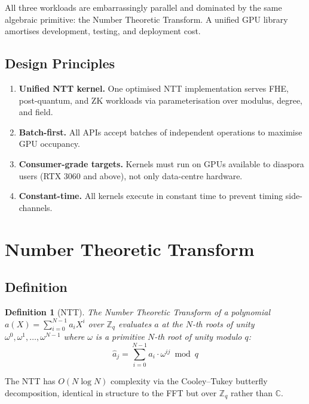 \documentclass[11pt,a4paper]{article}
\newtheorem{definition}{Definition}[section]
\begin{document}
All three workloads are embarrassingly parallel and dominated by the
same algebraic primitive: the Number Theoretic Transform.  A unified
GPU library amortises development, testing, and deployment cost.

\subsection{Design Principles}

\begin{enumerate}
    \item \textbf{Unified NTT kernel.}  One optimised NTT implementation
    serves FHE, post-quantum, and ZK workloads via parameterisation over
    modulus, degree, and field.
    \item \textbf{Batch-first.}  All APIs accept batches of independent
    operations to maximise GPU occupancy.
    \item \textbf{Consumer-grade targets.}  Kernels must run on GPUs
    available to diaspora users (RTX 3060 and above), not only
    data-centre hardware.
    \item \textbf{Constant-time.}  All kernels execute in constant time
    to prevent timing side-channels.
\end{enumerate}

\section{Number Theoretic Transform}
\label{sec:ntt}

\subsection{Definition}

\begin{definition}[NTT]
    The Number Theoretic Transform of a polynomial
    $a(X) = \sum_{i=0}^{N-1} a_i X^i$ over $\mathbb{Z}_q$ evaluates
    $a$ at the $N$-th roots of unity $\omega^0, \omega^1, \ldots,
    \omega^{N-1}$ where $\omega$ is a primitive $N$-th root of unity
    modulo $q$:
    \[
        \hat{a}_j = \sum_{i=0}^{N-1} a_i \cdot \omega^{ij} \bmod q
    \]
\end{definition}

The NTT has $O(N \log N)$ complexity via the Cooley--Tukey butterfly
decomposition, identical in structure to the FFT but over
$\mathbb{Z}_q$ rather than $\mathbb{C}$.
\end{document}
